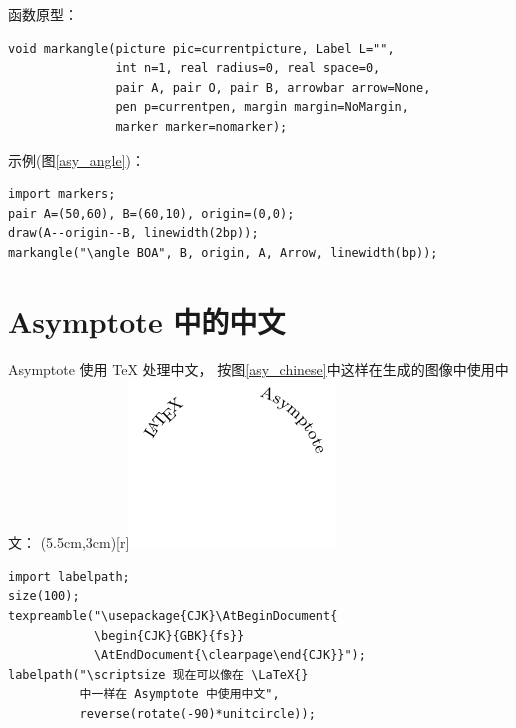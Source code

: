 \documentclass[a4paper,11pt]{article}
\begin{document}
\vspace{4mm}
函数原型：
\begin{Verbatim}
void markangle(picture pic=currentpicture, Label L="",
               int n=1, real radius=0, real space=0,
               pair A, pair O, pair B, arrowbar arrow=None,
               pen p=currentpen, margin margin=NoMargin,
               marker marker=nomarker);
\end{Verbatim}

示例(图\ref{asy_angle})：
\begin{Verbatim}
import markers;
pair A=(50,60), B=(60,10), origin=(0,0);
draw(A--origin--B, linewidth(2bp));
markangle("\angle BOA", B, origin, A, Arrow, linewidth(bp));
\end{Verbatim}

\section{Asymptote 中的中文}
Asymptote 使用 \TeX{} 处理中文，
按图\ref{asy_chinese}中这样在生成的图像中使用中文：
\parpic(5.5cm,3cm)[r]{\includegraphics{./figs/chinese.pdf}}
\begin{Verbatim}
import labelpath;
size(100);
texpreamble("\usepackage{CJK}\AtBeginDocument{
            \begin{CJK}{GBK}{fs}}
            \AtEndDocument{\clearpage\end{CJK}}");
labelpath("\scriptsize 现在可以像在 \LaTeX{}
          中一样在 Asymptote 中使用中文",
          reverse(rotate(-90)*unitcircle));
\end{Verbatim}
\end{document}
